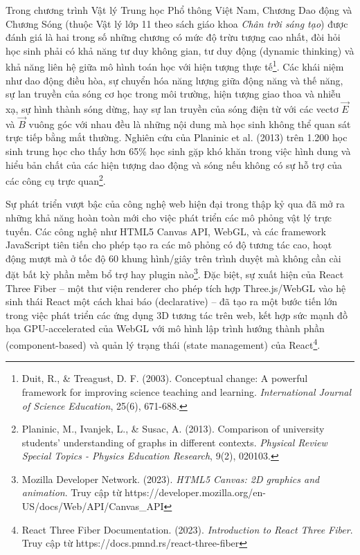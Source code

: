 Trong chương trình Vật lý Trung học Phổ thông Việt Nam, Chương Dao động và Chương Sóng (thuộc Vật lý lớp 11 theo sách giáo khoa \textit{Chân trời sáng tạo}) được đánh giá là hai trong số những chương có mức độ trừu tượng cao nhất, đòi hỏi học sinh phải có khả năng tư duy không gian, tư duy động (dynamic thinking) và khả năng liên hệ giữa mô hình toán học với hiện tượng thực tế\footnote{Duit, R., \& Treagust, D. F. (2003). Conceptual change: A powerful framework for improving science teaching and learning. \textit{International Journal of Science Education}, 25(6), 671-688.}. Các khái niệm như dao động điều hòa, sự chuyển hóa năng lượng giữa động năng và thế năng, sự lan truyền của sóng cơ học trong môi trường, hiện tượng giao thoa và nhiễu xạ, sự hình thành sóng dừng, hay sự lan truyền của sóng điện từ với các vectơ $\vec{E}$ và $\vec{B}$ vuông góc với nhau đều là những nội dung mà học sinh không thể quan sát trực tiếp bằng mắt thường. Nghiên cứu của Planinic et al. (2013) trên 1.200 học sinh trung học cho thấy hơn 65\% học sinh gặp khó khăn trong việc hình dung và hiểu bản chất của các hiện tượng dao động và sóng nếu không có sự hỗ trợ của các công cụ trực quan\footnote{Planinic, M., Ivanjek, L., \& Susac, A. (2013). Comparison of university students' understanding of graphs in different contexts. \textit{Physical Review Special Topics - Physics Education Research}, 9(2), 020103.}.

Sự phát triển vượt bậc của công nghệ web hiện đại trong thập kỷ qua đã mở ra những khả năng hoàn toàn mới cho việc phát triển các mô phỏng vật lý trực tuyến. Các công nghệ như HTML5 Canvas API, WebGL, và các framework JavaScript tiên tiến cho phép tạo ra các mô phỏng có độ tương tác cao, hoạt động mượt mà ở tốc độ 60 khung hình/giây trên trình duyệt mà không cần cài đặt bất kỳ phần mềm bổ trợ hay plugin nào\footnote{Mozilla Developer Network. (2023). \textit{HTML5 Canvas: 2D graphics and animation}. Truy cập từ https://developer.mozilla.org/en-US/docs/Web/API/Canvas\_API}. Đặc biệt, sự xuất hiện của React Three Fiber – một thư viện renderer cho phép tích hợp Three.js/WebGL vào hệ sinh thái React một cách khai báo (declarative) – đã tạo ra một bước tiến lớn trong việc phát triển các ứng dụng 3D tương tác trên web, kết hợp sức mạnh đồ họa GPU-accelerated của WebGL với mô hình lập trình hướng thành phần (component-based) và quản lý trạng thái (state management) của React\footnote{React Three Fiber Documentation. (2023). \textit{Introduction to React Three Fiber}. Truy cập từ https://docs.pmnd.rs/react-three-fiber}.

